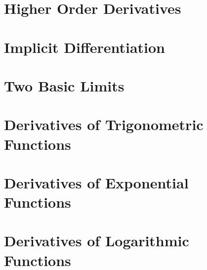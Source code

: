 \documentclass{report}
\begin{document}
\begin{multicols}{2}
  \section{Higher Order Derivatives}

  \section{Implicit Differentiation}

  \section{Two Basic Limits}

  \section{Derivatives of Trigonometric Functions}

  \section{Derivatives of Exponential Functions}

  \section{Derivatives of Logarithmic Functions}

\end{multicols}
\end{document}
